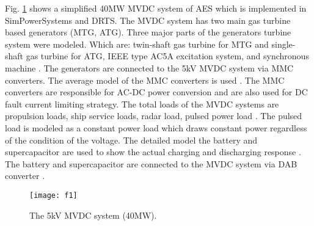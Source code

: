 Fig. \ref{sec2_f1} shows a simplified 40MW MVDC system of AES which is implemented in SimPowerSystems and DRTS. The MVDC system has two main gas turbine based generators (MTG, ATG). Three major parts of the generators turbine system were modeled. Which are: twin-shaft gas turbine for MTG and single-shaft gas turbine for ATG, IEEE type AC5A excitation system, and synchronous machine \cite{andrus2015notional}. The generators are connected to the 5kV MVDC system via MMC converters. The average model of the MMC converters is used \cite{sun2015experimental}. The MMC converters are responsible for AC-DC power conversion and are also used for DC fault current limiting strategy. The total loads of the MVDC systems are propulsion loads, ship service loads, radar load, pulsed power load \cite{andrus2015notional}. The pulsed load is modeled as a constant power load which draws constant power regardless of the condition of the voltage. The detailed model the battery and supercapacitor are used to show the actual charging and discharging response \cite{WinNT77}. The battery and supercapacitor are connected to the MVDC system via DAB converter   \cite{chung2009integration}. 
\begin{figure}[ht!]
\centering
\texttt{[image: f1]}
\caption{The 5kV MVDC system (40MW).}
\label{sec2_f1}
\end{figure}
